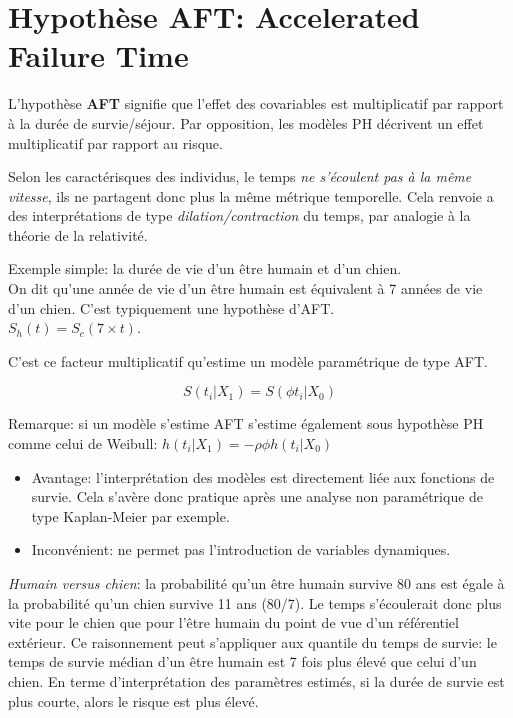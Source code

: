 \documentclass[
  12pt,
  letterpaper,
  DIV=11,
  numbers=noendperiod,
  onepage,
  openany]{scrreprt}
\providecommand{\tightlist}{%
  \setlength{\itemsep}{0pt}\setlength{\parskip}{0pt}}\usepackage{longtable,booktabs,array}
\begin{document}
\hypertarget{hypothuxe8se-aft-accelerated-failure-time}{%
\section{Hypothèse AFT: Accelerated Failure
Time}\label{hypothuxe8se-aft-accelerated-failure-time}}

L'hypothèse \textbf{AFT} signifie que l'effet des covariables est
multiplicatif par rapport à la durée de survie/séjour. Par opposition,
les modèles PH décrivent un effet multiplicatif par rapport au risque.

Selon les caractérisques des individus, le temps \emph{ne s'écoulent pas
à la même vitesse}, ils ne partagent donc plus la même métrique
temporelle. Cela renvoie a des interprétations de type
\emph{dilation/contraction} du temps, par analogie à la théorie de la
relativité.

Exemple simple: la durée de vie d'un être humain et d'un chien.\\
On dit qu'une année de vie d'un être humain est équivalent à 7 années de
vie d'un chien. C'est typiquement une hypothèse d'AFT.\\
\(S_h(t) = S_c(7\times t)\).

C'est ce facteur multiplicatif qu'estime un modèle paramétrique de type
AFT.

\[S(t_i | X_1)=  S(\phi t_i | X_0)\]

Remarque: si un modèle s'estime AFT s'estime également sous hypothèse PH
comme celui de Weibull: \(h(t_i | X_1)= -\rho \phi h(t_i | X_0)\)

\begin{itemize}
\tightlist
\item
  Avantage: l'interprétation des modèles est directement liée aux
  fonctions de survie. Cela s'avère donc pratique après une analyse non
  paramétrique de type Kaplan-Meier par exemple.
\item
  Inconvénient: ne permet pas l'introduction de variables dynamiques.
\end{itemize}

\emph{Humain versus chien}: la probabilité qu'un être humain survive 80
ans est égale à la probabilité qu'un chien survive 11 ans (80/7). Le
temps s'écoulerait donc plus vite pour le chien que pour l'être humain
du point de vue d'un référentiel extérieur. Ce raisonnement peut
s'appliquer aux quantile du temps de survie: le temps de survie médian
d'un être humain est 7 fois plus élevé que celui d'un chien. En terme
d'interprétation des paramètres estimés, si la durée de survie est plus
courte, alors le risque est plus élevé.
\end{document}

